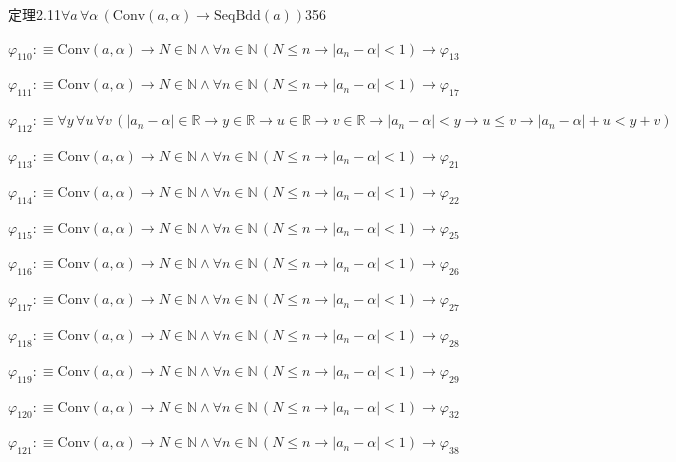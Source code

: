 \begin{fullproof}{定理2.11}{$\forall a\,\forall \alpha\,(\mathrm{Conv}(a,\alpha) \to \mathrm{SeqBdd}(a))$}{356}
\begin{abbrevlist}
\item $\varphi_{110} :\equiv \mathrm{Conv}(a,\alpha) \to N \in \mathbb{N} \land \forall n \in \mathbb{N}\,(N \leq n \to \lvert a_{n} - \alpha \rvert < 1) \to \varphi_{13}$
\item $\varphi_{111} :\equiv \mathrm{Conv}(a,\alpha) \to N \in \mathbb{N} \land \forall n \in \mathbb{N}\,(N \leq n \to \lvert a_{n} - \alpha \rvert < 1) \to \varphi_{17}$
\item $\varphi_{112} :\equiv \forall y\,\forall u\,\forall v\,(\lvert a_{n} - \alpha \rvert \in \mathbb{R} \to y \in \mathbb{R} \to u \in \mathbb{R} \to v \in \mathbb{R} \to \lvert a_{n} - \alpha \rvert < y \to u \leq v \to \lvert a_{n} - \alpha \rvert + u < y + v)$
\item $\varphi_{113} :\equiv \mathrm{Conv}(a,\alpha) \to N \in \mathbb{N} \land \forall n \in \mathbb{N}\,(N \leq n \to \lvert a_{n} - \alpha \rvert < 1) \to \varphi_{21}$
\item $\varphi_{114} :\equiv \mathrm{Conv}(a,\alpha) \to N \in \mathbb{N} \land \forall n \in \mathbb{N}\,(N \leq n \to \lvert a_{n} - \alpha \rvert < 1) \to \varphi_{22}$
\item $\varphi_{115} :\equiv \mathrm{Conv}(a,\alpha) \to N \in \mathbb{N} \land \forall n \in \mathbb{N}\,(N \leq n \to \lvert a_{n} - \alpha \rvert < 1) \to \varphi_{25}$
\item $\varphi_{116} :\equiv \mathrm{Conv}(a,\alpha) \to N \in \mathbb{N} \land \forall n \in \mathbb{N}\,(N \leq n \to \lvert a_{n} - \alpha \rvert < 1) \to \varphi_{26}$
\item $\varphi_{117} :\equiv \mathrm{Conv}(a,\alpha) \to N \in \mathbb{N} \land \forall n \in \mathbb{N}\,(N \leq n \to \lvert a_{n} - \alpha \rvert < 1) \to \varphi_{27}$
\item $\varphi_{118} :\equiv \mathrm{Conv}(a,\alpha) \to N \in \mathbb{N} \land \forall n \in \mathbb{N}\,(N \leq n \to \lvert a_{n} - \alpha \rvert < 1) \to \varphi_{28}$
\item $\varphi_{119} :\equiv \mathrm{Conv}(a,\alpha) \to N \in \mathbb{N} \land \forall n \in \mathbb{N}\,(N \leq n \to \lvert a_{n} - \alpha \rvert < 1) \to \varphi_{29}$
\item $\varphi_{120} :\equiv \mathrm{Conv}(a,\alpha) \to N \in \mathbb{N} \land \forall n \in \mathbb{N}\,(N \leq n \to \lvert a_{n} - \alpha \rvert < 1) \to \varphi_{32}$
\item $\varphi_{121} :\equiv \mathrm{Conv}(a,\alpha) \to N \in \mathbb{N} \land \forall n \in \mathbb{N}\,(N \leq n \to \lvert a_{n} - \alpha \rvert < 1) \to \varphi_{38}$

\end{abbrevlist}
\end{fullproof}
